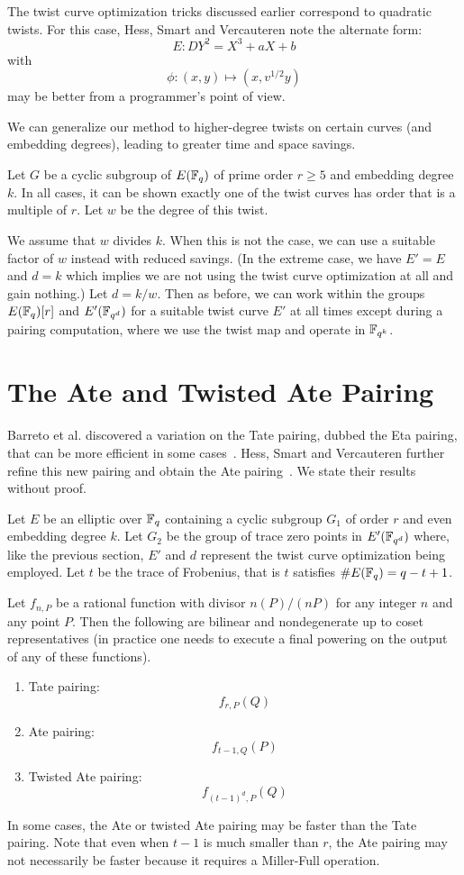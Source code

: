 The twist curve optimization tricks discussed earlier correspond to
quadratic twists.
For this case, Hess, Smart and Vercauteren note the alternate form:
\[ E : DY^2 = X^3 + a X + b \]
with
\[ \phi : (x,y) \mapsto (x, v^{1/2} y) \]
may be better from a programmer's point of view.

We can generalize our method to higher-degree twists
on certain curves (and embedding degrees), leading to greater time and space
savings.

Let $G$ be a cyclic subgroup of $E(\mathbb{F}_q)$ of prime order $r \ge 5$
and embedding degree $k$.
In all cases, it can be shown exactly one of the twist curves
has order that is a multiple of $r$. Let $w$ be the degree of this twist.

We assume that $w$ divides $k$. When this is not the case,
we can use a suitable factor of $w$ instead with reduced savings.
(In the extreme case, we have $E' = E$ and $d = k$ which implies we
are not using the twist curve optimization at all and gain nothing.)
Let $d = k/w$. Then as before, we can work within the groups $E(\mathbb{F}_q)[r]$
and $E'(\mathbb{F}_{q^d})$ for a suitable twist curve $E'$ at all times except
during a pairing computation, where we use the twist map and
operate in $\mathbb{F}_{q^k}$.

\section {The Ate and Twisted Ate Pairing}

Barreto et al. discovered a variation on the Tate pairing,
dubbed the Eta pairing, that can be more efficient in some cases~\cite{etapairing}.
Hess, Smart and Vercauteren further refine this new pairing and obtain
the Ate pairing~\cite{hsv}. We state their results without proof.

Let $E$ be an elliptic over $\mathbb{F}_q$ containing a cyclic subgroup $G_1$ of
order $r$ and even embedding degree $k$. Let $G_2$ be the group of trace zero
points in $E'(\mathbb{F}_{q^d})$ where, like the previous section,
$E'$ and $d$ represent the twist curve optimization
being employed. Let $t$ be the trace of Frobenius, that
is $t$ satisfies $\#E(\mathbb{F}_q) = q-t+1$.

Let $f_{n,P}$ be a rational function with divisor $n(P)/(nP)$ for any integer
$n$ and any point $P$. Then the following are bilinear and nondegenerate
up to coset representatives (in practice one needs to execute a final powering
on the output of any of these functions).
\begin{enumerate}
\item
Tate pairing:
\[ f_{r,P}(Q) \]
\item
Ate pairing:
\[ f_{t-1,Q}(P) \]
\item
Twisted Ate pairing:
\[ f_{(t-1)^d,P}(Q) \]
\end{enumerate}

In some cases, the Ate or twisted Ate pairing may be faster than the Tate
pairing. Note that even when $t-1$ is much smaller than $r$,
the Ate pairing may not necessarily be faster because it
requires a Miller-Full operation.
